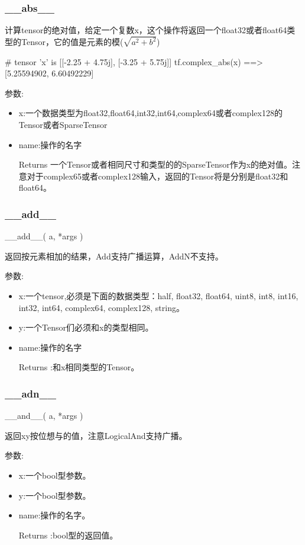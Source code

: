 \subsubsection{\_\_abs\_\_}
计算tensor的绝对值，给定一个复数x，这个操作将返回一个float32或者float64类型的Tensor，它的值是元素的模($\sqrt{a^2+b^2}$)
\begin{python}
# tensor 'x' is [[-2.25 + 4.75j], [-3.25 + 5.75j]]
tf.complex_abs(x) ==> [5.25594902, 6.60492229]
\end{python}
参数:
\begin{itemize}
	\item x:一个数据类型为float32,float64,int32,int64,complex64或者complex128的Tensor或者SparseTensor
	\item name:操作的名字
	\item[Returns]一个Tensor或者相同尺寸和类型的的SparseTensor作为x的绝对值。注意对于complex65或者complex128输入，返回的Tensor将是分别是float32和float64。
\end{itemize}
\subsubsection{\_\_add\_\_}
\begin{python}
__add__(
    a,
    *args
)
\end{python}
返回按元素相加的结果，Add支持广播运算，AddN不支持。

参数:
\begin{itemize}
	\item x:一个tensor,必须是下面的数据类型：half, float32, float64, uint8, int8, int16, int32, int64, complex64, complex128, string。
	\item y:一个Tensor们必须和x的类型相同。
	\item name:操作的名字
	\item[Returns]:和x相同类型的Tensor。
\end{itemize}
\subsubsection{\_\_adn\_\_}
\begin{python}
__and__(
    a,
    *args
)
\end{python}
返回xy按位想与的值，注意LogicalAnd支持广播。

参数:
\begin{itemize}
	\item x:一个bool型参数。
	\item y:一个bool型参数。
	\item name:操作的名字。
	\item[Returns]:bool型的返回值。
\end{itemize}

